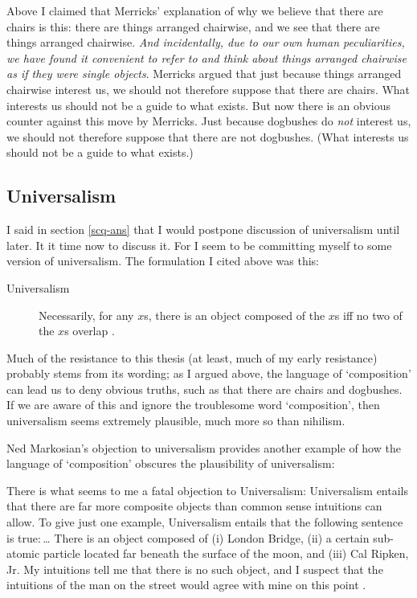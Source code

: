 \documentclass[11pt]{article}
\newenvironment{squote}{%
\begin{spacing}{1}
       	\begin{list}{}{%
\setlength{\labelwidth}{0pt}%
\rightmargin\leftmargin%
}
\item\relax
}{%
\end{list}%
\end{spacing}
}
\begin{document}
\begin{spacing}{1.25}
Above I claimed that Merricks' explanation of why we believe that
there are chairs is this: there are things arranged chairwise, and we
see that there are things arranged chairwise.  {\em And incidentally,
  due to our own human peculiarities, we have found it convenient to
  refer to and think about things arranged chairwise as if they were
  single objects}.  Merricks argued that just because things arranged
chairwise interest us, we should not therefore suppose that there are
chairs.  What interests us should not be a guide to what exists.  But
now there is an obvious counter against this move by Merricks.  Just
because dogbushes do {\em not} interest us, we should not therefore
suppose that there are not dogbushes.  (What interests us should not
be a guide to what exists.)

\subsection{Universalism}
\label{universalism}
I said in section \ref{scq-ans} that I would postpone discussion of
universalism until later.  It it time now to discuss it.  For I seem
to be committing myself to some version of universalism.  The
formulation I cited above was this:

\begin{description}
\item[Universalism] Necessarily, for any $x$s, there is an object
  composed of the $x$s iff no two of the $x$s overlap
  \citep[227]{markosian1998a}.
\end{description}

Much of the resistance to this thesis (at least, much of my early
resistance) probably stems from its wording; as I argued above, the
language of `composition' can lead us to deny obvious truths, such as
that there are chairs and dogbushes.  If we are aware of this and
ignore the troublesome word `composition', then universalism seems
extremely plausible, much more so than nihilism.

Ned Markosian's objection to universalism provides another example of
how the language of `composition' obscures the plausibility of
universalism:

\begin{squote}
There is what seems to me a fatal objection to Universalism:
Universalism entails that there are far more composite objects than
common sense intuitions can allow.  To give just one example,
Universalism entails that the following sentence is true:\,\ldots
There is an object composed of (i) London Bridge, (ii) a certain
sub-atomic particle located far beneath the surface of the moon, and
(iii) Cal Ripken, Jr.  My intuitions tell me that there is no such
object, and I suspect that the intuitions of the man on the street
would agree with mine on this point \citeyearpar[228]{markosian1998a}.
\end{squote}


\end{spacing}
\end{document}
